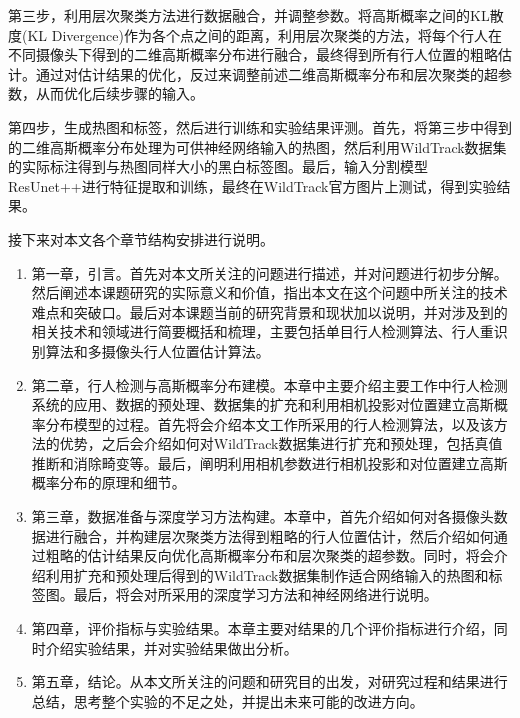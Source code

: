 第三步，利用层次聚类方法进行数据融合，并调整参数。将高斯概率之间的KL散度(KL Divergence)作为各个点之间的距离，利用层次聚类的方法，将每个行人在不同摄像头下得到的二维高斯概率分布进行融合，最终得到所有行人位置的粗略估计。通过对估计结果的优化，反过来调整前述二维高斯概率分布和层次聚类的超参数，从而优化后续步骤的输入。

第四步，生成热图和标签，然后进行训练和实验结果评测。首先，将第三步中得到的二维高斯概率分布处理为可供神经网络输入的热图，然后利用WildTrack数据集的实际标注得到与热图同样大小的黑白标签图。最后，输入分割模型ResUnet++\cite{jha2019resunet}进行特征提取和训练，最终在WildTrack官方图片上测试，得到实验结果。

接下来对本文各个章节结构安排进行说明。

\begin{enumerate}
  \item 第一章，引言。首先对本文所关注的问题进行描述，并对问题进行初步分解。然后阐述本课题研究的实际意义和价值，指出本文在这个问题中所关注的技术难点和突破口。最后对本课题当前的研究背景和现状加以说明，并对涉及到的相关技术和领域进行简要概括和梳理，主要包括单目行人检测算法、行人重识别算法和多摄像头行人位置估计算法。
  \item 第二章，行人检测与高斯概率分布建模。本章中主要介绍主要工作中行人检测系统的应用、数据的预处理、数据集的扩充和利用相机投影对位置建立高斯概率分布模型的过程。首先将会介绍本文工作所采用的行人检测算法，以及该方法的优势，之后会介绍如何对WildTrack数据集进行扩充和预处理，包括真值推断和消除畸变等。最后，阐明利用相机参数进行相机投影和对位置建立高斯概率分布的原理和细节。
  \item 第三章，数据准备与深度学习方法构建。本章中，首先介绍如何对各摄像头数据进行融合，并构建层次聚类方法得到粗略的行人位置估计，然后介绍如何通过粗略的估计结果反向优化高斯概率分布和层次聚类的超参数。同时，将会介绍利用扩充和预处理后得到的WildTrack数据集制作适合网络输入的热图和标签图。最后，将会对所采用的深度学习方法和神经网络进行说明。
  \item 第四章，评价指标与实验结果。本章主要对结果的几个评价指标进行介绍，同时介绍实验结果，并对实验结果做出分析。
  \item 第五章，结论。从本文所关注的问题和研究目的出发，对研究过程和结果进行总结，思考整个实验的不足之处，并提出未来可能的改进方向。
\end{enumerate}
